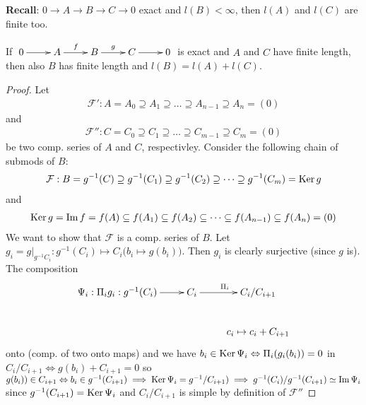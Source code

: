 \noindent\textbf{Recall}: \(0\rightarrow A \rightarrow B \rightarrow C \rightarrow 0\) exact and \(l(B) < \infty\), then \(l(A)\) and \(l(C)\) are finite too.
\begin{prop}
\label{Prop 12}
If \(\xymatrix{0\ar[r] & A\ar[r]^f & B\ar[r]^g & C\ar[r] & 0}\) is exact and \(A\) and \(C\) have finite length, then also \(B\) has finite length and \(l(B) = l(A) + l(C)\).
\end{prop}
\begin{proof}
Let 
\begin{align*}
    \mathcal{F}': A = A_0 \supseteq A_1 \supseteq\dots\supseteq A_{n-1}\supseteq A_n = (0)
\end{align*}
and
\begin{align*}
    \mathcal{F}'': C = C_0 \supseteq C_1 \supseteq\dots\supseteq C_{m-1}\supseteq C_m = (0)
\end{align*}
be two comp. series of \(A\) and \(C\), respectivley. Consider the following chain of submods of \(B\):\\[0.2cm]
\begin{align*}
    \mathcal{F}: B = g^{-1}(C) \supseteq g^{-1}(C_1) \supseteq g^{-1}(C_2) \supseteq\dots\supseteq g^{-1}(C_m) = \operatorname{Ker}\nolimits g
\end{align*}
and
\begin{align}
    \operatorname{Ker}\nolimits g = \operatorname{Im}\nolimits f = f(A) \subseteq f(A_1) \subseteq f(A_2) \subseteq\dots\subseteq f(A_{n-1}) \subseteq f(A_n) = (0)
\end{align}
We want to show that \(\mathcal{F}\) is a comp. series of \(B\). Let \(g_i = g|_{g^{-1}C_i}: g^{-1}(C_i)\mapsto C_i \big(b_i\mapsto g(b_i)\big)\). Then \(g_i\) is clearly surjective (since \(g\) is). The composition
\begin{align*}
\xymatrix{\Psi_i:\Pi_i g_i: g^{-1}(C_i)\ar[r] & C_i\ar[r]^{\Pi_i} & C_i/C_{i+1}  \\
 & & c_i \mapsto c_i + C_{i+1}}
\end{align*} 
 onto (comp. of two onto maps) and we have \(b_i\in \operatorname{Ker}\nolimits \Psi_i \Leftrightarrow \Pi_i(g_i(b_i)) = 0\) in \(C_i/C_{i+1} \Leftrightarrow g(b_i) + C_{i+1} = 0\) so \(g(b_i))\in C_{i+1} \Leftrightarrow b_i\in g^{-1}(C_{i+1})\implies \operatorname{Ker}\nolimits\Psi_i = g^{-1}/C_{i+1})\implies g^{-1}(C_i)/g^{-1}(C_{i+1}) \simeq \operatorname{Im}\nolimits \Psi_i\) since \(g^{-1}(C_{i+1}) = \operatorname{Ker}\nolimits \Psi_i\) and \(C_i/C_{i+1}\) is simple by definition of \(\mathcal{F}''\)
 \end{proof}

